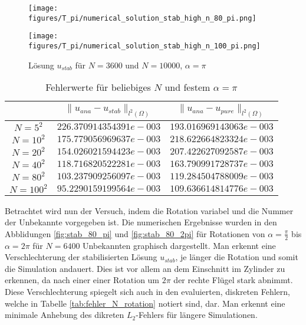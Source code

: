 \documentclass[12pt,titlepage]{article}
\begin{document}
\begin{figure}[H]
\hspace{0.1cm}
\begin{minipage}{0.4\textwidth}
\texttt{[image: figures/T\_pi/numerical\_solution\_stab\_high\_n\_80\_pi.png]}
\end{minipage}
\hspace{1.4cm}
\begin{minipage}{0.4\textwidth}
\texttt{[image: figures/T\_pi/numerical\_solution\_stab\_high\_n\_100\_pi.png]}
\end{minipage}
\caption{Lösung $u_{stab}$ für $N=3600$ und $N=10000$, $\alpha=\pi$}
\label{fig:stab_80_100_pi}
\end{figure}
\noindent
\begin{table}[H]
\centering
\begin{tabular}[\textwidth]{|c|c|c|}
\hline
  & $\|u_{ana}-u_{stab}\|_{l^2(\Omega)}
$ & $\|u_{ana}-u_{pure}\|_{l^2(\Omega)}$\\
\hline
$N=5^2$ & $226.370914354391e-003$ & $193.016969143063e-003$\\
$N=10^2$ & $175.779056969637e-003$ & $218.622664823324e-003$\\
$N=20^2$ & $154.026021594423e-003$ & $207.422627092587e-003$\\
\hline
$N=40^2$ & $118.716820522281e-003$ & $163.790991728737e-003$\\
$N=80^2$ & $103.237909256097e-003$ & $119.284504788009e-003$\\
$N=100^2$ & $95.2290159199564e-003$ & $109.636614814776e-003$\\
\hline
\end{tabular}
\caption{Fehlerwerte für beliebiges $N$ und festem $\alpha=\pi$}
\label{tab:fehler_N_pi}
\end{table}
\noindent
Betrachtet wird nun der Versuch, indem die Rotation variabel und die Nummer der Unbekannte vorgegeben ist. Die numerischen Ergebnisse wurden in den Abblidungen \ref{fig:stab_80_pi} und \ref{fig:stab_80_2pi} für Rotationen von $\alpha=\frac{\pi}{2}$ bis $\alpha=2\pi$ für $N=6400$ Unbekannten graphisch dargestellt. Man erkennt eine Verschlechterung der stabilisierten Lösung $u_{stab}$, je länger die Rotation und somit die Simulation andauert. Dies ist vor allem an dem Einschnitt im Zylinder zu erkennen, da nach einer einer Rotation um  $2\pi$ der rechte Flügel stark abnimmt. Diese Verschlechterung spiegelt sich auch in den evaluierten, diskreten Fehlern, welche in Tabelle \ref{tab:fehler_N_rotation} notiert sind, dar. Man erkennt eine minimale Anhebung des dikreten $L_2$-Fehlers für längere Simulationen.
\end{document}
